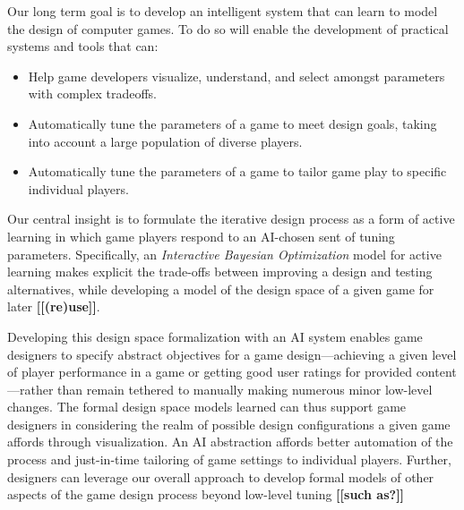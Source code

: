 \documentclass[letterpaper]{article}
\newcommand{\mytodo}[1]{\textbf{[[#1]]}}
\begin{document}
Our long term goal is to develop an intelligent system that can learn to model the design of computer games.
To do so will enable the development of practical systems and tools that can:

\begin{itemize}
\item Help game developers visualize, understand, and select amongst parameters with complex tradeoffs.
\item Automatically tune the parameters of a game to meet design goals, taking into account a large population of diverse players.
\item Automatically tune the parameters of a game to tailor game play to specific individual players.
\end{itemize}

Our central insight is to formulate the iterative design process as a form of active learning in which game players respond to an AI-chosen sent of tuning parameters.
Specifically, an {\em Interactive Bayesian Optimization} model for active learning makes explicit the trade-offs between improving a design and testing alternatives, while developing a model of the design space of a given game for later \mytodo{(re)use}.

Developing this design space formalization with an AI system enables game designers to specify abstract objectives for a game design---achieving a given level of player performance in a game or getting good user ratings for provided content---rather than remain tethered to manually making numerous minor low-level changes.
The formal design space models learned can thus support game designers in considering the realm of possible design configurations a given game affords through visualization.
An AI abstraction affords better automation of the process and just-in-time tailoring of game settings to individual players.
Further, designers can leverage our overall approach to develop formal models of other aspects of the game design process beyond low-level tuning \mytodo{such as?}
\end{document}
